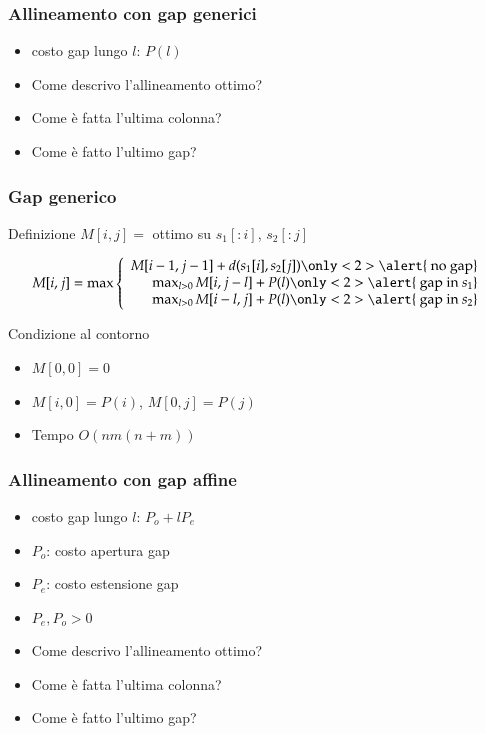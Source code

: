 \begin{frame}[fragile]
\frametitle{Allineamento con gap generici}
\begin{itemize}[<+->]
\item
costo gap lungo $l$: $P(l)$
\item
Come descrivo l'allineamento ottimo?
\item
Come è fatta l'ultima colonna?
\item
Come è fatto l'ultimo gap?
\end{itemize}
\end{frame}

\begin{frame}[fragile]
\frametitle{Gap generico}
\begin{block}{Definizione}
$M[i,j] = $ ottimo su $s_{1}[:i]$, $s_{2}[:j]$
\end{block}
\begin{equation*}
M[i,j] = \max \left\{
\begin{array}{r}%
M[i-1, j-1] + d(s_{1}[i], s_{2}[j])\only<2>{\alert{\text{ no gap}}}\\
\max_{l>0} M[i  , j-l] + P(l)\only<2>{\alert{\text{ gap in }s_{1}}}\\
\max_{l>0} M[i-l, j  ] + P(l)\only<2>{\alert{\text{ gap in }s_{2}}}
\end{array}
\right.
\end{equation*}
\begin{block}{Condizione al contorno}
\begin{itemize}[<+->]
\item
$M[0,0] = 0$
\item
$M[i,0] = P(i)$, $M[0,j] = P(j)$
\item
Tempo $O(nm(n+m))$
\end{itemize}
\end{block}
\end{frame}


\begin{frame}[fragile]
\frametitle{Allineamento con gap affine}
\begin{itemize}[<+->]
\item
costo gap lungo $l$: $P_{o} + lP_{e}$
\item
$P_{o}$: costo apertura gap
\item
$P_{e}$: costo estensione gap
\item
$P_{e}, P_{o}>0$
\item
Come descrivo l'allineamento ottimo?
\item
Come è fatta l'ultima colonna?
\item
Come è fatto l'ultimo gap?
\end{itemize}
\end{frame}


